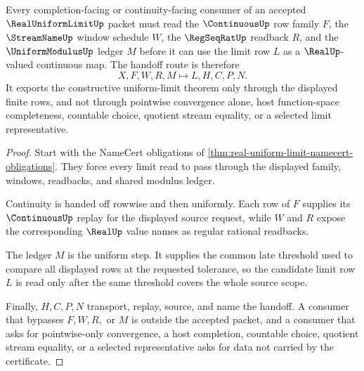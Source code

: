 \begin{theorem}
\label{thm:real-uniform-limit-continuity-handoff}
Every completion-facing or continuity-facing consumer of an accepted $\RealUniformLimitUp$ packet must read the $\ContinuousUp$ row family $F$, the $\StreamNameUp$ window schedule $W$, the $\RegSeqRatUp$ readback $R$, and the $\UniformModulusUp$ ledger $M$ before it can use the limit row $L$ as a $\RealUp$-valued continuous map. The handoff route is therefore
$$
X,F,W,R,M \longmapsto L,H,C,P,N .
$$
It exports the constructive uniform-limit theorem only through the displayed finite rows, and not through pointwise convergence alone, host function-space completeness, countable choice, quotient stream equality, or a selected limit representative.
\end{theorem}
\begin{proof}
Start with the NameCert obligations of \autoref{thm:real-uniform-limit-namecert-obligations}. They force every limit read to pass through the displayed family, windows, readbacks, and shared modulus ledger.

Continuity is handed off rowwise and then uniformly. Each row of $F$ supplies its $\ContinuousUp$ replay for the displayed source request, while $W$ and $R$ expose the corresponding $\RealUp$ value names as regular rational readbacks.

The ledger $M$ is the uniform step. It supplies the common late threshold used to compare all displayed rows at the requested tolerance, so the candidate limit row $L$ is read only after the same threshold covers the whole source scope.

Finally, $H,C,P,N$ transport, replay, source, and name the handoff. A consumer that bypasses $F,W,R,$ or $M$ is outside the accepted packet, and a consumer that asks for pointwise-only convergence, a host completion, countable choice, quotient stream equality, or a selected representative asks for data not carried by the certificate.
\end{proof}

